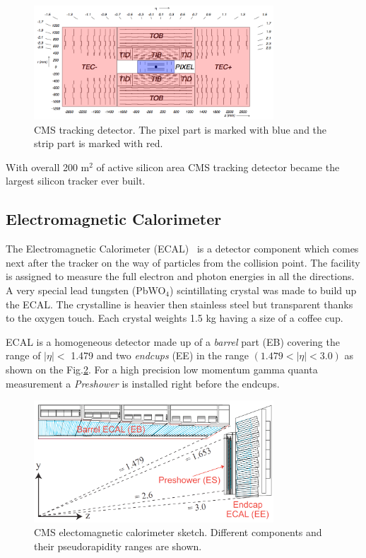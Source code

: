 \begin{figure}[t]
  \centering
  \includegraphics[width=0.8\textwidth]{02_experimental_setup/plots/img_cms_tracker_view.png}
  \caption{CMS tracking detector. The pixel part is marked with blue and the strip part is marked with red.}
  \label{fig:tracker}
\end{figure}

With overall 200 m$^2$ of active silicon area CMS tracking detector became the largest silicon tracker ever built. 

\subsection{Electromagnetic Calorimeter}

The Electromagnetic Calorimeter (ECAL)~\cite{ECALtdr, ECALtdradd, CMSatLHC} is a detector component which comes next after the tracker on the way of particles from
the collision point. The facility is assigned to measure the full electron and photon energies in all the directions. 
A very special lead tungsten (PbWO$_{4}$) scintillating crystal was made to build up the ECAL. The crystalline is heavier then stainless steel but transparent thanks 
to the oxygen touch. Each crystal weights 1.5 kg having a size of a coffee cup.

ECAL is a homogeneous detector made up of a \textit{barrel} part (EB) covering the range of $|\eta| <$ 1.479 and two \textit{endcups} (EE) in the range $(1.479 < |\eta| < 3.0)$
as shown on the Fig.\ref{fig:ecal}. For a high precision low momentum gamma quanta measurement a \textit{Preshower} is installed right before 
the endcups.

\begin{figure}[t]
  \centering
  \includegraphics[width=0.8\textwidth]{02_experimental_setup/plots/Figures_Experimental_Apparatus_ECALRapidity.png}
  \caption{CMS electomagnetic calorimeter sketch. Different components and their pseudorapidity ranges are shown.}
  \label{fig:ecal}
\end{figure}

